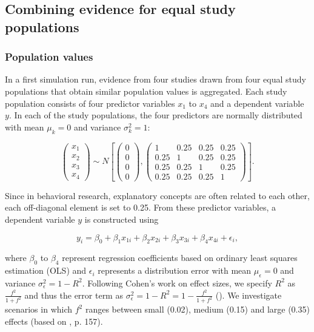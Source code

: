 \documentclass[11pt, a4paper]{article} %
\begin{document}
\subsection{Combining evidence for equal study populations}

\subsubsection{Population values}
\noindent In a first simulation run, evidence from four studies drawn from four equal study populations that obtain similar population values is aggregated. Each study population consists of four predictor variables $x_1$ to $x_4$ and a dependent variable $y$. In each of the study populations, the four predictors are normally distributed with mean $\mu_k=0$ and variance $\sigma^2_k=1$: 

\begin{equation}
\left(\begin{array}{c}x_1\\x_2\\x_3\\x_4 \end{array}\right) \sim N \left[\left(\begin{array}{c}0\\ 0 \\ 0 \\ 0 \end{array}\right), \left(\begin{array}{cccc}1 & 0.25 & 0.25 & 0.25 \\ 0.25 & 1 & 0.25 &  0.25 \\
0.25 & 0.25 & 1 &  0.25 \\
0.25 & 0.25 & 0.25 & 1 \end{array}\right)\right].
\end{equation}

\noindent Since in behavioral research, explanatory concepts are often related to each other, each off-diagonal element is set to 0.25. From these predictor variables, a dependent variable $y$ is constructed using

\begin{equation}
y_i=\beta_0+\beta_1x_{1i}+ \beta_2x_{2i} +\beta_3x_{3i} +\beta_4x_{4i}+\epsilon_i,
\end{equation}

\noindent where $\beta_0$ to $\beta_4$ represent regression coefficients based on ordinary least squares estimation (OLS) and $\epsilon_i$ represents a distribution error with mean $\mu_\epsilon=0$ and variance $\sigma^2_\epsilon=1-R^2$. Following Cohen's work on effect sizes, we specify $R^2$ as $\frac{f^2}{1+f^2}$ and thus the error term as  $\sigma^2_\epsilon=1-R^2=1-\frac{f^2}{1+f^2}$ (\cite{Cohen1992}). We investigate scenarios in which $f^2$ ranges between small (0.02), medium (0.15) and large (0.35) effects (based on \cite{Cohen1992}, p. 157). 
\end{document}
